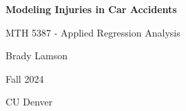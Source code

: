 \begin{titlepage}
	\centering
    \vspace*{\fill}
	{\huge\bfseries Modeling Injuries in Car Accidents\par}
    \vspace{1cm}
    {\Large MTH 5387 - Applied Regression Analysis\par}
	\vspace{1cm}
	{\Large Brady Lamson\par}
    \vspace{1cm}
    {\Large Fall 2024}
	\vfill


	{\large CU Denver\par}
\end{titlepage}